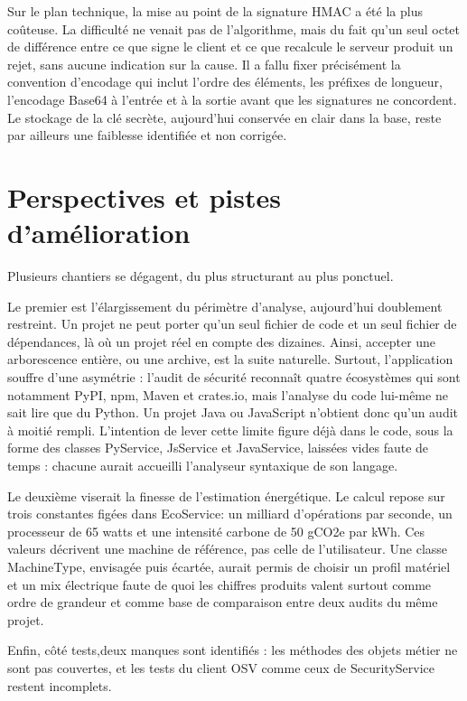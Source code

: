 \documentclass[a4paper,12pt]{article}
\begin{document}
Sur le plan technique, la mise au point de la signature HMAC a été la
plus coûteuse. La difficulté ne venait pas de l'algorithme, mais du fait
qu'un seul octet de différence entre ce que signe le client et ce que
recalcule le serveur produit un rejet, sans aucune indication sur la
cause. Il a fallu fixer précisément la convention d'encodage qui inclut
l'ordre des éléments, les préfixes de longueur, l'encodage Base64 à
l'entrée et à la sortie avant que les signatures ne concordent. Le
stockage de la clé secrète, aujourd'hui conservée en clair dans la base,
reste par ailleurs une faiblesse identifiée et non corrigée.

\newpage{}

\section{Perspectives et pistes
d'amélioration}\label{perspectives-et-pistes-damuxe9lioration}

Plusieurs chantiers se dégagent, du plus structurant au plus ponctuel.

Le premier est l'élargissement du périmètre d'analyse, aujourd'hui
doublement restreint. Un projet ne peut porter qu'un seul fichier de
code et un seul fichier de dépendances, là où un projet réel en compte
des dizaines. Ainsi, accepter une arborescence entière, ou une archive,
est la suite naturelle. Surtout, l'application souffre d'une asymétrie :
l'audit de sécurité reconnaît quatre écosystèmes qui sont notamment
PyPI, npm, Maven et crates.io, mais l'analyse du code lui-même ne sait
lire que du Python. Un projet Java ou JavaScript n'obtient donc qu'un
audit à moitié rempli. L'intention de lever cette limite figure déjà
dans le code, sous la forme des classes PyService, JsService et
JavaService, laissées vides faute de temps : chacune aurait accueilli
l'analyseur syntaxique de son langage.

Le deuxième viserait la finesse de l'estimation énergétique. Le calcul
repose sur trois constantes figées dans EcoService: un milliard
d'opérations par seconde, un processeur de 65 watts et une intensité
carbone de 50 gCO2e par kWh. Ces valeurs décrivent une machine de
référence, pas celle de l'utilisateur. Une classe MachineType, envisagée
puis écartée, aurait permis de choisir un profil matériel et un mix
électrique faute de quoi les chiffres produits valent surtout comme
ordre de grandeur et comme base de comparaison entre deux audits du même
projet.

Enfin, côté tests,deux manques sont identifiés : les méthodes des objets
métier ne sont pas couvertes, et les tests du client OSV comme ceux de
SecurityService restent incomplets.
\end{document}
